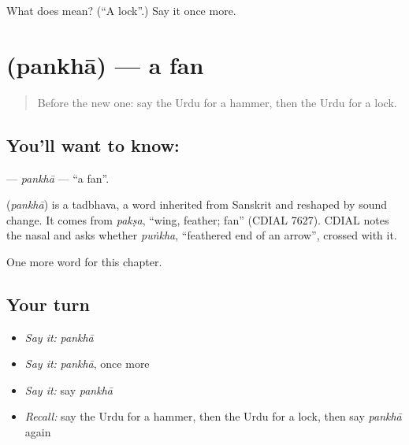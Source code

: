 \begin{tcolorbox}[breakable,colback=teal!4,colframe=teal!35!black,title={Before you move on}]
What does  mean? (\textquotedblleft{}A lock\textquotedblright{}.) Say it once more.
\end{tcolorbox}
\section[\texorpdfstring{\ur{پنکھا} (pankhā)}{پنکھا (pankhā)}]{ (pankhā) — a fan}

\label{lesson:UR-C108-pankha}



\begin{quote}
Before the new one: say the Urdu for a hammer, then the Urdu for a lock.
\end{quote}

\subsection*{You'll want to know: }
\textbf{} — \emph{pankhā} — \textquotedblleft{}a fan\textquotedblright{}.

\begin{cousinweb}
\textbf{} (\emph{pankhā}) is a tadbhava, a word inherited from Sanskrit and reshaped by sound change. It comes from \emph{pakṣa}, \textquotedblleft{}wing, feather; fan\textquotedblright{} (CDIAL 7627). CDIAL notes the nasal and asks whether \emph{puṅkha}, \textquotedblleft{}feathered end of an arrow\textquotedblright{}, crossed with it.
\end{cousinweb}

\begin{grammarlens}[title={What you've built}]
One more word for this chapter.
\end{grammarlens}

\subsection*{Your turn}
\begin{itemize}
\raggedright
  \item \emph{Say it:} \emph{pankhā}
  \item \emph{Say it:} \emph{pankhā}, once more
  \item \emph{Say it:} say \emph{pankhā}
  \item \emph{Recall:} say the Urdu for a hammer, then the Urdu for a lock, then say \emph{pankhā} again
\end{itemize}

